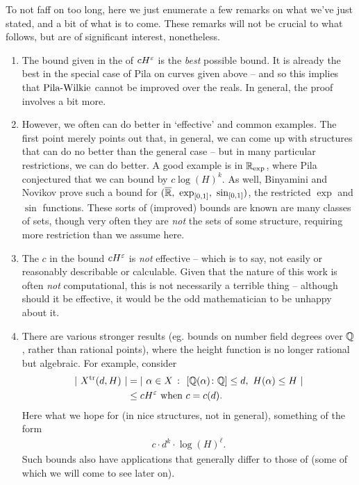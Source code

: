 To not faff on too long, here we just enumerate a few remarks on what we've just stated, and a bit of what is to come. These remarks will not be crucial to what follows, but are of significant interest, nonetheless.
\begin{remark}
\begin{enumerate}
  \item The bound given in the \pwt of $\bound[H]$ is the \emph{best} possible bound. It is already the best in the special case of Pila on curves given above -- and so this implies that $\pw$ cannot be improved over the reals. In general, the proof involves a bit more.

  \item However, we often can do better in `effective' and common examples. The first point merely points out that, in general, we can come up with structures that can do no better than the general case -- but in many particular restrictions, we can do better. A good example is in $\R_{\textrm{exp}}$, where Pila conjectured that we can bound by $c \log{(H)^k}$. As well, Binyamini and Novikov \cite{binyamini_wilkies_2017} prove such a bound for $(\overline{\R}, \ \operatorname{exp}_{[0, 1]}, \ \operatorname{sin}_{[0, 1]})$, the restricted $\operatorname{exp}$ and $\operatorname{sin}$ functions. These sorts of (improved) bounds are known are many classes of sets, though very often they are \emph{not} the  sets of some \om structure, requiring more restriction than we assume here.

  \item The $c$ in the bound $\bound$ is \emph{not} effective -- which is to say, not easily or reasonably describable or calculable. Given that the nature of this work is often \emph{not} computational, this is not necessarily a terrible thing -- although should it be effective, it would be the odd mathematician to be unhappy about it.

  \item There are various stronger results (eg. bounds on number field degrees over $\Q$, rather than rational points), where the height function is no longer rational but algebraic. For example, consider
      \begin{align*}
        \card{ \ \Xtr (d, H) \ } &= \card{ \ \alpha \in X \ \colon \ [\Q(\alpha) \colon \Q] \leq d, \ H(\alpha) \leq H \ } \\
                                 &\leq \bound[H] \textrm{ when } c = c(d).
      \end{align*}
    Here what we hope for (in nice structures, not in general), something of the form
      \begin{align*}
        c \cdot d^k \cdot \log{(H)}^{\ell}.
      \end{align*}
    Such bounds also have applications that generally differ to those of \pw (some of which we will come to see later on).


\end{enumerate}
\end{remark}
